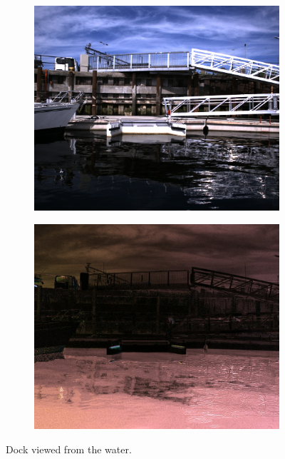\begin{figure}[H]
    \begin{subfigure}[T]{.49\textwidth}
        \includegraphics[width=\textwidth]{figures/pictures/img_11640_s0.jpg}
    \end{subfigure} \hfill
    \begin{subfigure}[T]{.49\textwidth}
        \includegraphics[width=\textwidth]{figures/pictures/img_11640_pol.jpg}
    \end{subfigure}
    \caption{Dock viewed from the water.}
\end{figure}
\vspace{-.5cm}

